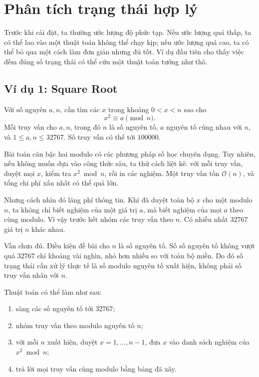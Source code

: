 \documentclass[11pt]{article}
\newcommand{\Oh}{\mathcal{O}}
\begin{document}
\section{Phân tích trạng thái hợp lý}

Trước khi cài đặt, ta thường ước lượng độ phức tạp. Nếu ước lượng quá thấp, ta
có thể lao vào một thuật toán không thể chạy kịp; nếu ước lượng quá cao, ta có
thể bỏ qua một cách làm đơn giản nhưng đủ tốt. Ví dụ đầu tiên cho thấy việc
đếm đúng số trạng thái có thể cứu một thuật toán tưởng như thô.

\subsection{Ví dụ 1: Square Root}

Với số nguyên \(a,n\), cần tìm các \(x\) trong khoảng \(0<x<n\) sao cho
\[
  x^2\equiv a\pmod n.
\]
Mỗi truy vấn cho \(a,n\), trong đó \(n\) là số nguyên tố, \(a\) nguyên tố cùng
nhau với \(n\), và \(1\le a,n\le 32767\). Số truy vấn có thể tới
\(100000\).

Bài toán căn bậc hai modulo có các phương pháp số học chuyên dụng. Tuy nhiên,
nếu không muốn dựa vào công thức sâu, ta thử cách liệt kê: với mỗi truy vấn,
duyệt mọi \(x\), kiểm tra \(x^2\bmod n\), rồi in các nghiệm. Một truy vấn tốn
\(\Oh(n)\), và tổng chi phí xấu nhất có thể quá lớn.

Nhưng cách nhìn đó lãng phí thông tin. Khi đã duyệt toàn bộ \(x\) cho một
modulo \(n\), ta không chỉ biết nghiệm của một giá trị \(a\), mà biết nghiệm
của mọi \(a\) theo cùng modulo. Vì vậy trước hết nhóm các truy vấn theo
\(n\). Có nhiều nhất \(32767\) giá trị \(n\) khác nhau.

Vẫn chưa đủ. Điều kiện đề bài cho \(n\) là số nguyên tố. Số số nguyên tố không
vượt quá \(32767\) chỉ khoảng vài nghìn, nhỏ hơn nhiều so với toàn bộ miền.
Do đó số trạng thái cần xử lý thực tế là số modulo nguyên tố xuất hiện, không
phải số truy vấn nhân với \(n\).

Thuật toán có thể làm như sau:
\begin{enumerate}
  \item sàng các số nguyên tố tới \(32767\);
  \item nhóm truy vấn theo modulo nguyên tố \(n\);
  \item với mỗi \(n\) xuất hiện, duyệt \(x=1,\ldots,n-1\), đưa \(x\) vào danh
  sách nghiệm của \(x^2\bmod n\);
  \item trả lời mọi truy vấn cùng modulo bằng bảng đã xây.
\end{enumerate}
\end{document}
